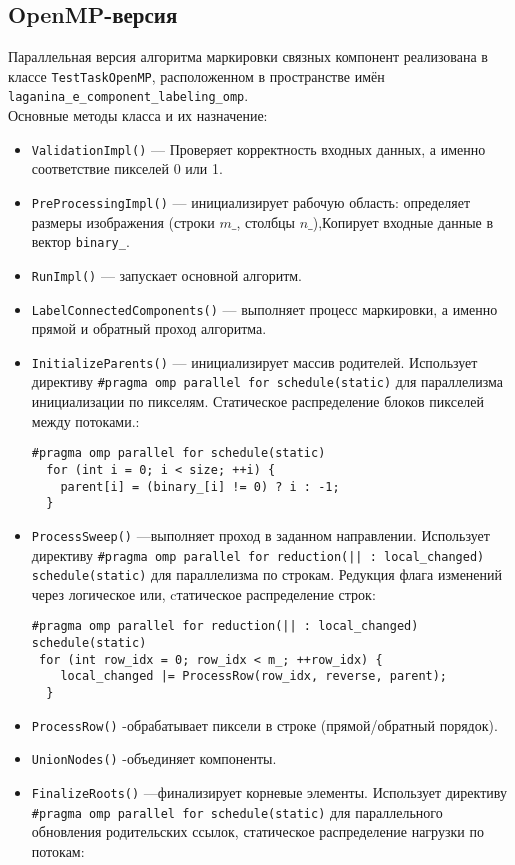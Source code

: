 \documentclass[12pt]{extarticle}
\begin{document}
\subsection{OpenMP-версия}

\hspace*{1.25cm}Параллельная версия алгоритма маркировки связных компонент реализована в классе \texttt{TestTaskOpenMP}, расположенном в пространстве имён \texttt{laganina\_e\_component\_labeling\_omp}. \\[-0.2cm]

Основные методы класса и их назначение:
\begin{itemize}
    \item \texttt{ValidationImpl()} — Проверяет корректность входных данных, а именно соответствие пикселей 0 или 1.
    \item \texttt{PreProcessingImpl()} — инициализирует рабочую область: определяет размеры изображения (строки $m\_$, столбцы $n\_$),Копирует входные данные в вектор \texttt{binary\_}.
    \item \texttt{RunImpl()} — запускает основной алгоритм.
    \item \texttt{LabelConnectedComponents()} — выполняет процесс маркировки, а именно прямой и обратный проход алгоритма.
    \item \texttt{InitializeParents()} — инициализирует массив родителей. Использует директиву \texttt{\#pragma omp parallel for schedule(static)} для параллелизма инициализации по пикселям. Статическое распределение блоков пикселей между потоками.:

    \begin{lstlisting}[caption={Параллельная по пикселям инициализация в методе InitializeParents},label={all}]
#pragma omp parallel for schedule(static)
  for (int i = 0; i < size; ++i) {
    parent[i] = (binary_[i] != 0) ? i : -1;
  }
    \end{lstlisting}
    \item \texttt{ProcessSweep()} —выполняет проход в заданном направлении. Использует директиву \texttt{\#pragma omp parallel for reduction(|| : local\_changed) schedule(static)} для параллелизма по строкам. Редукция флага изменений через логическое или, cтатическое распределение строк:

    \begin{lstlisting}[caption={Параллельная по по строкам редукция флага изменений в методе ProcessSweep},label={all}]
#pragma omp parallel for reduction(|| : local_changed) schedule(static)
 for (int row_idx = 0; row_idx < m_; ++row_idx) {
    local_changed |= ProcessRow(row_idx, reverse, parent);
  }
    \end{lstlisting}
    \item \texttt{ProcessRow()} -обрабатывает пиксели в строке (прямой/обратный порядок).
    \item \texttt{UnionNodes()} -объединяет компоненты.
     \item \texttt{FinalizeRoots()} —финализирует корневые элементы. Использует директиву \texttt{\#pragma omp parallel for schedule(static)} для параллельного обновления родительских ссылок, статическое распределение нагрузки по потокам:


\end{itemize}
\end{document}
